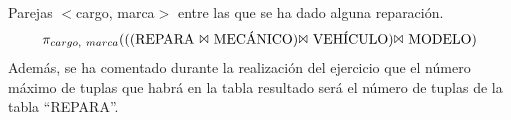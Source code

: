 \documentclass[12pt]{article}
\begin{document}
\portada[%
        titulo=Fundamentos de Bases de Datos,
        subtitulo=Ejercicio 5 del Seminario 4 (Álgebra Relacional),
        autor=Jesús Muñoz Velasco,
        año=Curso 2024-2025]

\setcounter{ejercicio}{4}

\begin{ejercicio}
    Parejas $<$cargo, marca$>$ entre las que se ha dado alguna reparación.
    \endsquare
    \begin{align*}
        \pi_{cargo,\ marca}(((\text{REPARA } \Bowtie \text{ MECÁNICO})\Bowtie \text{ VEHÍCULO})\Bowtie \text{ MODELO})
    \end{align*}
    Además, se ha comentado durante la realización del ejercicio que el número máximo de tuplas que habrá en la tabla resultado será el número de tuplas de la tabla ``REPARA''.
\end{ejercicio}
    
\end{document}
